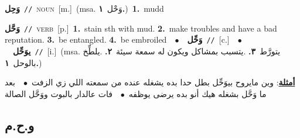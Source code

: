 \documentclass[10pt,a4paper,twoside]{article} %
\begin{document}
\begin{multicols}{2}
{\setlength\topsep{0pt}\textbf{\foreignlanguage{arabic}{وَحِل}}\ {\color{gray}\texttt{//}\color{black}}\ \textsc{noun}\ [m.]\ \color{gray}(msa. \foreignlanguage{arabic}{وَحْل}~\foreignlanguage{arabic}{\textbf{١.}})\color{black}\ \textbf{1.}~mudd\ } \vspace{2mm}

{\setlength\topsep{0pt}\textbf{\foreignlanguage{arabic}{وَحَّل}}\ {\color{gray}\texttt{//}\color{black}}\ \textsc{verb}\ [p.]\ \textbf{1.}~stain sth with mud.  \textbf{2.}~make troubles and have a bad reputation.  \textbf{3.}~be entangled.  \textbf{4.}~be embroiled\ \ $\bullet$\ \ \setlength\topsep{0pt}\textbf{\foreignlanguage{arabic}{وَحِّل}}\ {\color{gray}\texttt{//}\color{black}}\ [c.]\ \ $\bullet$\ \ \setlength\topsep{0pt}\textbf{\foreignlanguage{arabic}{يوَحِّل}}\ {\color{gray}\texttt{//}\color{black}}\ [i.]\ \color{gray}(msa. \foreignlanguage{arabic}{يتورَّط}~\foreignlanguage{arabic}{\textbf{٣.}}  .\foreignlanguage{arabic}{يتسبب بمشاكل ويكون له سمعة سيئة}~\foreignlanguage{arabic}{\textbf{٢.}}  .\foreignlanguage{arabic}{يلطِّخ بالوحل}~\foreignlanguage{arabic}{\textbf{١.}})\color{black}\  \begin{flushright}\color{gray}\foreignlanguage{arabic}{\textbf{\underline{\foreignlanguage{arabic}{أمثلة}}}: وين مايروح بيوَحِّل بطل حدا بده يشغله عنده من سمعته اللي زي الزفت\ $\bullet$\ \  بعد ما وَحَّل بشغله هيك أنو بده يرضى يوظفه\ $\bullet$\ \  فات عالدار بالبوت ووَحَّل الصالة}\end{flushright}\color{black}} \vspace{2mm}

\vspace{-3mm}
\subsection*{\color{blue}\foreignlanguage{arabic}{و.ح.م}\color{blue}{}} 


\end{multicols}
\end{document}

